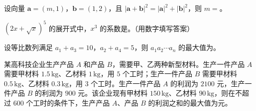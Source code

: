 \begin{question}
设向量 $\boldsymbol a=(m,1)$，$\boldsymbol b=(1,2)$，且 $|\boldsymbol a+\boldsymbol b|^2=|\boldsymbol a|^2+|\boldsymbol b|^2$，则 $m=$\gkblank{}。

\end{question}
\begin{question}
$(2x+\sqrt{x})^5$ 的展开式中，$x^3$ 的系数是\gkblank{}。（用数字填写答案）

\end{question}
\begin{question}
设等比数列满足 $a_1+a_3=10$，$a_2+a_4=5$，则 $a_1a_2\cdots a_n$ 的最大值为\gkblank{}。

\end{question}
\begin{question}
某高科技企业生产产品 $A$ 和产品 $B$，需要甲、乙两种新型材料。生产一件产品 $A$ 需要甲材料 $1.5\,\mathrm{kg}$、乙材料 $1\,\mathrm{kg}$，用 $5$ 个工时；生产一件产品 $B$ 需要甲材料 $0.5\,\mathrm{kg}$、乙材料 $0.3\,\mathrm{kg}$，用 $3$ 个工时。生产一件产品 $A$ 的利润为 $2100$ 元，生产一件产品 $B$ 的利润为 $900$ 元。该企业现有甲材料 $150\,\mathrm{kg}$、乙材料 $90\,\mathrm{kg}$，则在不超过 $600$ 个工时的条件下，生产产品 $A$、产品 $B$ 的利润之和的最大值为\gkblank{}元。

\end{question}

